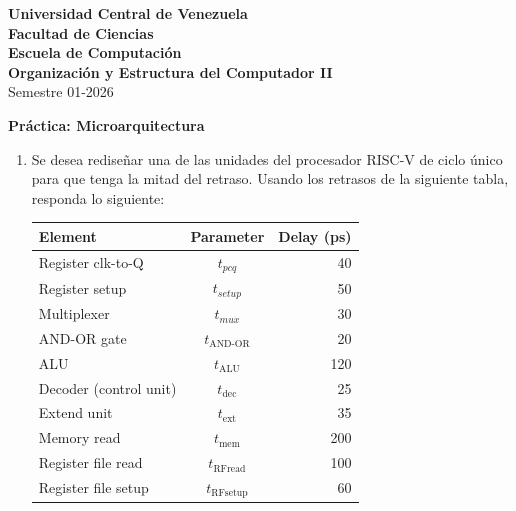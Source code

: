 \documentclass[letterpaper,12pt]{article}
\begin{document}

\noindent \textbf{Universidad Central de Venezuela}\\
\textbf{Facultad de Ciencias}\\
\textbf{Escuela de Computación}\\
\textbf{Organización y Estructura del Computador II}\\
Semestre 01-2026

\vspace{0.3cm}
\begin{center}
{\textbf{Práctica: Microarquitectura}}
\end{center}
\vspace{0.5cm}


\begin{enumerate}

    \item Se desea rediseñar una de las unidades del procesador RISC-V de ciclo único para que tenga la mitad del retraso. Usando los retrasos de la siguiente tabla, responda lo siguiente:

    \begin{center}
        \small
        \begin{tabular}{|l|c|r|}
            \hline
            \textbf{Element} & \textbf{Parameter} & \textbf{Delay (ps)} \\
            \hline
            Register clk-to-Q & $t_{pcq}$ & 40 \\
            Register setup & $t_{setup}$ & 50 \\
            Multiplexer & $t_{mux}$ & 30 \\
            AND-OR gate & $t_{\text{AND-OR}}$ & 20 \\
            ALU & $t_{\text{ALU}}$ & 120 \\
            Decoder (control unit) & $t_{\text{dec}}$ & 25 \\
            Extend unit & $t_{\text{ext}}$ & 35 \\
            Memory read & $t_{\text{mem}}$ & 200 \\
            Register file read & $t_{\text{RFread}}$ & 100 \\
            Register file setup & $t_{\text{RFsetup}}$ & 60 \\
            \hline
        \end{tabular}
    \end{center}


\end{enumerate}
\end{document}
